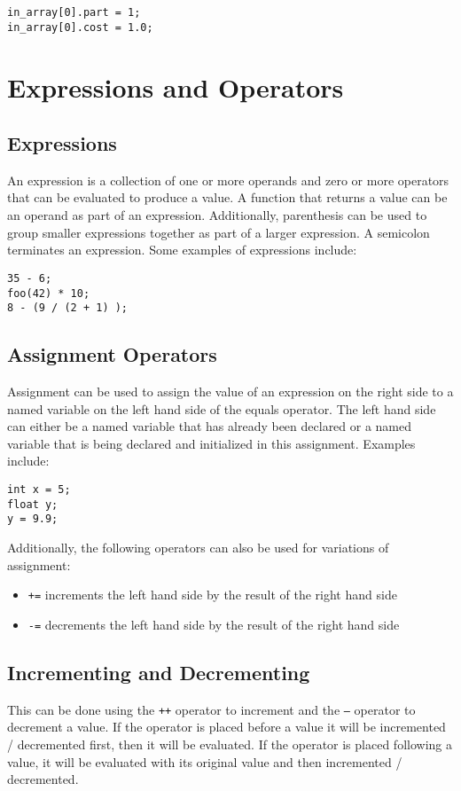 \documentclass{article}
\begin{document}
 \begin{lstlisting}
in_array[0].part = 1;
in_array[0].cost = 1.0;
\end{lstlisting}

\section{Expressions and Operators}

\subsection{Expressions}
An expression is a collection of one or more operands and zero or more operators that can be evaluated to produce a value.  A function that returns a value can be an operand as part of an expression.  Additionally, parenthesis can be used to group smaller expressions together as part of a larger expression.  A semicolon terminates an expression.  Some examples of expressions include:
\begin{lstlisting}
35 - 6;
foo(42) * 10;
8 - (9 / (2 + 1) );
\end{lstlisting}

\subsection{Assignment Operators}
Assignment can be used to assign the value of an expression on the right side to a named variable on the left hand side of the equals operator.  The left hand side can either be a named variable that has already been declared or a named variable that is being declared and initialized in this assignment.  Examples include:
\begin{lstlisting}
int x = 5;
float y;
y = 9.9;
\end{lstlisting}

Additionally, the following operators can also be used for variations of assignment:

\begin{itemize}
\item \texttt{+=} increments the left hand side by the result of the right hand side
\item \texttt{-=} decrements the left hand side by the result of the right hand side
\end{itemize}

\subsection{Incrementing and Decrementing}
This can be done using the \texttt{++} operator to increment and the \texttt{--} operator to decrement a value.  If the operator is placed before a value it will be incremented / decremented first, then it will be evaluated.  If the operator is placed following a value, it will be evaluated with its original value and then incremented / decremented.
\end{document}
